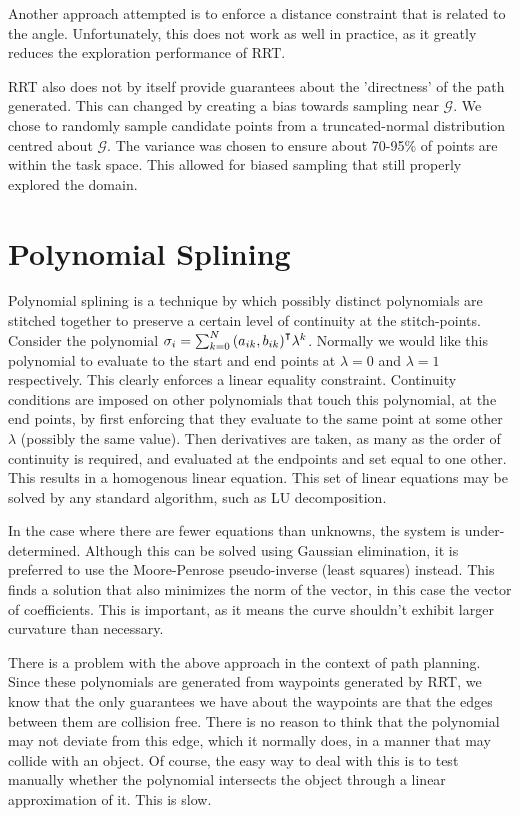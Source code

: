 \documentclass[oneside, 11pt]{book}
\begin{document}
Another approach attempted is to enforce a distance constraint that is related to the angle. Unfortunately, this does not work as well in practice, as it greatly reduces the exploration performance of RRT.

RRT also does not by itself provide guarantees about the 'directness' of the path generated. This can changed by creating a bias towards sampling near $\mathcal{G}$\cite{LaValle06}\cite{Yang14}. We chose to randomly sample candidate points from a truncated-normal distribution centred about $\mathcal{G}$. The variance was chosen to ensure about 70-95\% of points are within the task space. This allowed for biased sampling that still properly explored the domain.

\section{Polynomial Splining}
Polynomial splining is a technique by which possibly distinct polynomials are stitched together to preserve a certain level of continuity at the stitch-points. Consider the polynomial $\sigma_i = \sum_{k=0}^N{{(a_{ik},b_{ik})}^{\intercal}\lambda^k}$. Normally we would like this polynomial to evaluate to the start and end points at $\lambda=0$ and $\lambda=1$ respectively. This clearly enforces a linear equality constraint. Continuity conditions are imposed on other polynomials that touch this polynomial, at the end points, by first enforcing that they evaluate to the same point at some other $\lambda$ (possibly the same value). Then derivatives are taken, as many as the order of continuity is required, and evaluated at the endpoints and set equal to one other. This results in a homogenous linear equation. This set of linear equations may be solved by any standard algorithm, such as LU decomposition.

In the case where there are fewer equations than unknowns, the system is under-determined. Although this can be solved using Gaussian elimination, it is preferred to use the Moore-Penrose pseudo-inverse (least squares) instead. This finds a solution that also minimizes the norm of the vector, in this case the vector of coefficients. This is important, as it means the curve shouldn't exhibit larger curvature than necessary.

There is a problem with the above approach in the context of path planning. Since these polynomials are generated from waypoints generated by RRT, we know that the only guarantees we have about the waypoints are that the edges between them are collision free. There is no reason to think that the polynomial may not deviate from this edge, which it normally does, in a manner that may collide with an object. Of course, the easy way to deal with this is to test manually whether the polynomial intersects the object through a linear approximation of it. This is slow.
\end{document}
